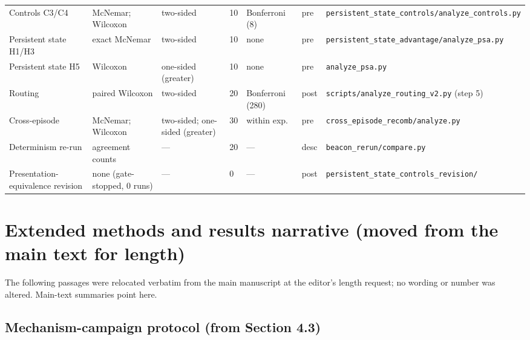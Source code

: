 \documentclass[10pt]{article}
\begin{document}
\begin{table}[h]
\begin{tabular}{L{2.5cm}L{2.5cm}L{2.4cm}L{0.7cm}L{1.8cm}L{0.7cm}L{3.4cm}}
Controls C3/C4 & McNemar; Wilcoxon & two-sided & 10 & Bonferroni (8) & pre & \texttt{persistent\_state\_\allowbreak controls/\allowbreak analyze\_controls.py} \\
Persistent state H1/H3 & exact McNemar & two-sided & 10 & none & pre & \texttt{persistent\_state\_\allowbreak advantage/\allowbreak analyze\_psa.py} \\
Persistent state H5 & Wilcoxon & one-sided (greater) & 10 & none & pre & \texttt{analyze\_psa.py} \\
Routing & paired Wilcoxon & two-sided & 20 & Bonferroni (280) & post & \texttt{scripts/\allowbreak analyze\_routing\_v2.py} (step 5) \\
Cross-episode & McNemar; Wilcoxon & two-sided; one-sided (greater) & 30 & within exp. & pre & \texttt{cross\_episode\_\allowbreak recomb/\allowbreak analyze.py} \\
Determinism re-run & agreement counts & --- & 20 & --- & desc & \texttt{beacon\_rerun/compare.py} \\
Presentation-equivalence revision & none (gate-stopped, 0 runs) & --- & 0 & --- & post & \texttt{persistent\_state\_\allowbreak controls\_\allowbreak revision/} \\
\bottomrule
\end{tabular}
\end{table}


\section{Extended methods and results narrative (moved from the main text for length)}
The following passages were relocated verbatim from the main manuscript at the editor's length request; no wording or number was altered. Main-text summaries point here.

\subsection{Mechanism-campaign protocol (from Section 4.3)}
\end{document}

